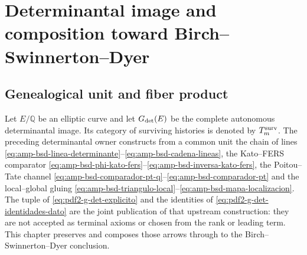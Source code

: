\chapter{Determinantal image and composition toward Birch--Swinnerton--Dyer}

\section{Genealogical unit and fiber product}

Let $E/\mathbb Q$ be an elliptic curve and let
$\mathfrak G_{\rm det}(E)$ be the complete autonomous determinantal image. Its
category of surviving histories is denoted by
$\mathcal T_m^{\rm surv}$. The preceding determinantal owner constructs from a
common unit the chain of lines
\eqref{eq:amp-bsd-linea-determinante}--\eqref{eq:amp-bsd-cadena-lineas}, the
Kato--FERS comparator
\eqref{eq:amp-bsd-phi-kato-fers}--\eqref{eq:amp-bsd-inversa-kato-fers}, the
Poitou--Tate channel
\eqref{eq:amp-bsd-comparador-pt-q}--\eqref{eq:amp-bsd-comparador-pt} and the
local--global gluing
\eqref{eq:amp-bsd-triangulo-local}--\eqref{eq:amp-bsd-mapa-localizacion}.
The tuple of \eqref{eq:pdf2-g-det-explicito} and the identities of
\eqref{eq:pdf2-g-det-identidades-dato} are the joint publication of that
upstream construction: they are not accepted as terminal axioms or chosen
from the rank or leading term. This chapter preserves and composes
those arrows through to the Birch--Swinnerton--Dyer conclusion.

